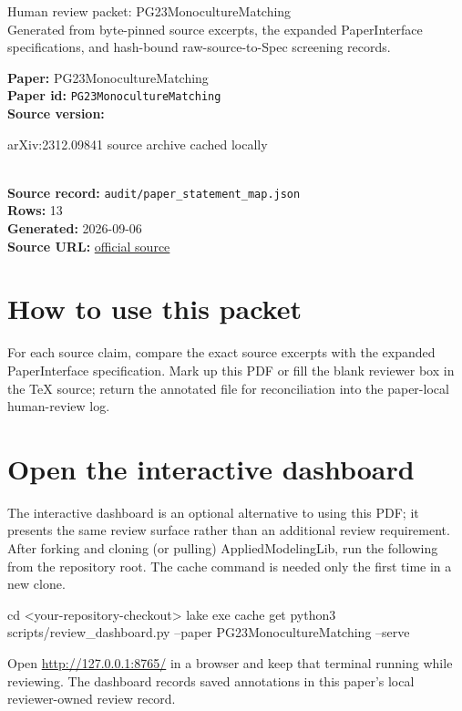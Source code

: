 \documentclass[10pt]{article}
\begin{document}
\fontsize{9}{10}\selectfont

\begin{center}
{\LARGE Human review packet: PG23MonocultureMatching}\\[0.35em]
\small Generated from byte-pinned source excerpts, the expanded PaperInterface
specifications, and hash-bound raw-source-to-Spec screening records.
\end{center}

\noindent\textbf{Paper:} PG23MonocultureMatching\\
\textbf{Paper id:} \texttt{PG23MonocultureMatching}\\
\textbf{Source version:} \parbox[t]{0.76\linewidth}{\raggedright arXiv:2312.09841 source archive cached locally}\\
\textbf{Source record:} \texttt{audit/paper\_statement\_map.json}\\
\textbf{Rows:} 13\\
\textbf{Generated:} 2026-09-06\\
\textbf{Source URL:} \href{https://arxiv.org/abs/2312.09841}{official source}





\section*{How to use this packet}
For each source claim, compare the exact source excerpts with the expanded
PaperInterface specification. Mark up this PDF or fill the blank reviewer box in the TeX source;
return the annotated file for reconciliation into the paper-local human-review
log.

\section*{Open the interactive dashboard}
The interactive dashboard is an optional alternative to using this PDF; it
presents the same review surface rather than an additional review requirement.
After forking and cloning (or pulling) AppliedModelingLib, run the following from the
repository root. The cache command is needed only the first time in a new clone.
\begin{ReviewVerbatim}
cd <your-repository-checkout>
lake exe cache get
python3 scripts/review_dashboard.py --paper PG23MonocultureMatching --serve
\end{ReviewVerbatim}
Open \url{http://127.0.0.1:8765/} in a browser and keep that terminal running
while reviewing. The dashboard records saved annotations in this paper's local
reviewer-owned review record.
\end{document}
